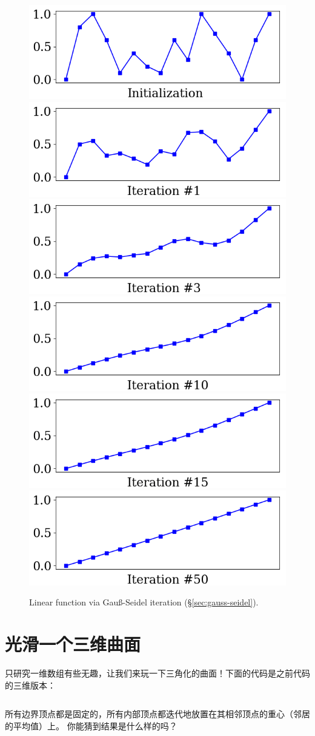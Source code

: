 \documentclass[notitlepage,oneside]{book}
\begin{document}
\begin{figure}[ht]
    \centering
    \includegraphics[width=.32\linewidth]{img/example_3_2_0.png}
    \includegraphics[width=.32\linewidth]{img/example_3_2_1.png}
    \includegraphics[width=.32\linewidth]{img/example_3_2_2.png}
    \includegraphics[width=.32\linewidth]{img/example_3_2_3.png}
    \includegraphics[width=.32\linewidth]{img/example_3_2_4.png}
    \includegraphics[width=.32\linewidth]{img/example_3_2_5.png}
    \caption{Linear function via Gauß-Seidel iteration (\S\ref{sec:gauss-seidel}).}
    \label{fig:arraysmooth_gs}
\end{figure}

\section{光滑一个三维曲面}
\label{sec:3dsmooth}
只研究一维数组有些无趣，让我们来玩一下三角化的曲面！下面的代码是之前代码的三维版本：
\inputminted[frame=single,linenos=true]{python}{listings/example_3.3.py}
所有边界顶点都是固定的，所有内部顶点都迭代地放置在其相邻顶点的重心（邻居的平均值）上。
你能猜到结果是什么样的吗？
\end{document}
